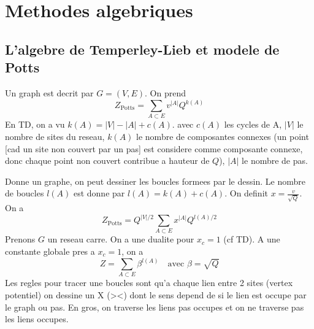 \documentclass[a4paper]{book}
\theoremstyle{definition}
\theoremstyle{remark}
\begin{document}
\chapter{Methodes algebriques}

\section{L'algebre de Temperley-Lieb et modele de Potts}
Un graph est decrit par $G = (V, E)$. On prend
\begin{equation}
    Z_\text{Potts} = \sum_{A \subset E} v^{|A|}Q^{k(A)}
\end{equation}
En TD, on a vu $k(A) = |V| - |A| + c(A)$. avec $c(A)$ les cycles de A, $|V|$ le nombre de sites du reseau, $k(A)$ le nombre de composantes connexes (un point [cad un site non couvert par un pas] est considere comme composante connexe, donc chaque point non couvert contribue a hauteur de $Q$), $|A|$ le nombre de pas. \par \medskip 

Donne un graphe, on peut dessiner les boucles formees par le dessin. Le nombre de boucles $l(A)$ est donne par $l(A) = k(A) + c(A)$. On definit $x = \frac{v}{\sqrt{Q}}$. On a 
\begin{equation}
    Z_{\text{Potts}} = Q^{|V|/2}\sum_{A\subset E} x^{|A|} Q^{l(A)/2}
\end{equation}
Prenons $G$ un reseau carre. On a une dualite pour $x_c = 1$ (cf TD). A une constante globale pres a $x_c = 1$, on a 
\begin{equation}
    Z = \sum_{A\subset E} \beta^{l(A)} \quad \text{avec  } \beta = \sqrt{Q}
\end{equation}
Les regles pour tracer une boucles sont qu'a chaque lien entre 2 sites (vertex potentiel) on dessine un X (><) dont le sens depend de si le lien est occupe par le graph ou pas. En gros, on traverse les liens pas occupes et on ne traverse pas les liens occupes. 
\end{document}

